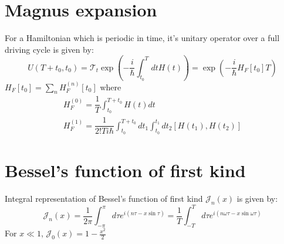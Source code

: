 \documentclass[11pt,a4paper]{article}
\begin{document}
\section{Magnus expansion}
For a Hamiltonian which is periodic in time, it's unitary operator over a full driving cycle is given by:
\begin{equation}
U(T+ t_0, t_0)= \mathcal{T}_t\exp(- \dfrac{i}{\hbar} \int_{t_0}^T dt H(t))= \exp(- \dfrac{i}{\hbar}  H_F[t_0]T)
\end{equation}
$ H_F[t_0]= \sum_n H_F^{(n)}[t_0] $ 
where 
\begin{align*}
H_F^{(0)}= \dfrac{1}{T} \int_{t_0}^{T+t_0} H(t) dt \\
H_F^{(1)}= \dfrac{1}{2! T i \hbar} \int_{t_0}^{T+t_0}  dt_1\int_{t_0}^{t_1} dt_2  [H(t_1), H(t_2)] 
\end{align*}
\section{Bessel's function of first kind}
Integral representation of Bessel's function of first kind $\mathcal{J}_n (x)$ is given by:
\begin{equation}
\mathcal{J}_n (x)=  \frac{1}{2 \pi} \int_{-\pi}^\pi d\tau e^{i(n \tau - x \sin \tau)}= \frac{1}{T} \int_{-T}^T d\tau e^{i(n   \omega \tau - x \sin \omega \tau)}
\end{equation}
For $x \ll1$, $\mathcal{J}_0 (x)= 1- \frac{x^2}{2}$
 


%
\end{document}
